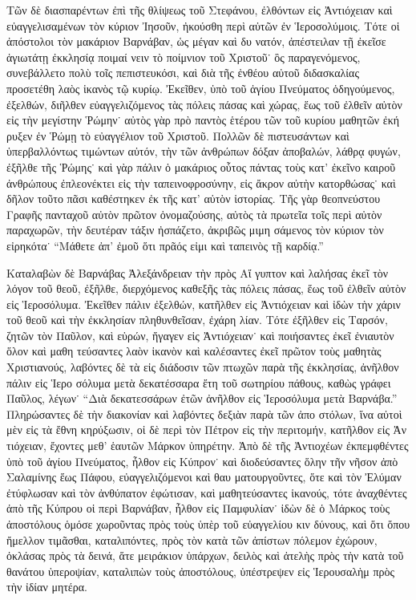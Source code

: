 Τῶν δὲ διασπαρέντων ἐπὶ τῆς θλίψεως τοῦ Στεφάνου,
ἐλθόντων εἰς Ἀντιόχειαν καὶ εὐαγγελισαμένων τὸν κύριον
Ἰησοῦν, ἠκούσθη περὶ αὐτῶν ἐν Ἱεροσολύμοις. Τότε οἱ
ἀπόστολοι τὸν μακάριον Βαρνάβαν, ὡς μέγαν καὶ δυ%
νατόν, ἀπέστειλαν τῇ ἐκεῖσε ἁγιωτάτῃ ἐκκλησίᾳ ποιμαί%
νειν τὸ ποίμνιον τοῦ Χριστοῦ˙ ὃς παραγενόμενος,
συνεβάλλετο πολὺ τοῖς πεπιστευκόσι, καὶ διὰ τῆς ἐνθέου
αὐτοῦ διδασκαλίας προσετέθη λαὸς ἱκανὸς τῷ κυρίῳ.
Ἐκεῖθεν, ὑπὸ τοῦ ἁγίου Πνεύματος ὁδηγούμενος, ἐξελθών,
διῆλθεν εὐαγγελιζόμενος τὰς πόλεις πάσας καὶ χώρας,
ἕως τοῦ ἐλθεῖν αὐτὸν εἰς τὴν μεγίστην Ῥώμην˙ αὐτὸς
γὰρ πρὸ παντὸς ἑτέρου τῶν τοῦ κυρίου μαθητῶν ἐκή%
ρυξεν ἐν Ῥώμῃ τὸ εὐαγγέλιον τοῦ Χριστοῦ. Πολλῶν
δὲ πιστευσάντων καὶ ὑπερβαλλόντως τιμώντων αὐτόν,
τὴν τῶν ἀνθρώπων δόξαν ἀποβαλών, λάθρᾳ φυγών,
ἐξῆλθε τῆς Ῥώμης˙ καὶ γὰρ πάλιν ὁ μακάριος οὗτος
πάντας τοὺς κατ’ ἐκεῖνο καιροῦ ἀνθρώπους ἐπλεονέκτει
εἰς τὴν ταπεινοφροσύνην, εἰς ἄκρον αὐτὴν κατορθώσας˙
καὶ δῆλον τοῦτο πᾶσι καθέστηκεν ἐκ τῆς κατ’ αὐτὸν
ἱστορίας. Τῆς γὰρ θεοπνεύστου Γραφῆς πανταχοῦ αὐτὸν
πρῶτον ὀνομαζούσης, αὐτὸς τὰ πρωτεῖα τοῖς περὶ αὐτὸν
παραχωρῶν, τὴν δευτέραν τάξιν ἠσπάζετο, ἀκριβῶς μιμη%
σάμενος τὸν κύριον τὸν εἰρηκότα˙ \enquote{Μάθετε ἀπ’ ἐμοῦ ὅτι
πρᾶός εἰμι καὶ ταπεινὸς τῇ καρδίᾳ.}

Καταλαβὼν δὲ Βαρνάβας Ἀλεξάνδρειαν τὴν πρὸς Αἴ%
γυπτον καὶ λαλήσας ἐκεῖ τὸν λόγον τοῦ θεοῦ, ἐξῆλθε,
διερχόμενος καθεξῆς τὰς πόλεις πάσας, ἕως τοῦ ἐλθεῖν
αὐτὸν εἰς Ἱεροσόλυμα. Ἐκεῖθεν πάλιν ἐξελθών, κατῆλθεν
εἰς Ἀντιόχειαν καὶ ἰδὼν τὴν χάριν τοῦ θεοῦ καὶ τὴν
ἐκκλησίαν πληθυνθεῖσαν, ἐχάρη λίαν. Τότε ἐξῆλθεν εἰς
Ταρσόν, ζητῶν τὸν Παῦλον, καὶ εὑρών, ἤγαγεν εἰς
Ἀντιόχειαν˙ καὶ ποιήσαντες ἐκεῖ ἐνιαυτὸν ὅλον καὶ μαθη%
τεύσαντες λαὸν ἱκανὸν καὶ καλέσαντες ἐκεῖ πρῶτον τοὺς
μαθητὰς Χριστιανούς, λαβόντες δὲ τὰ εἰς διάδοσιν τῶν
πτωχῶν παρὰ τῆς ἐκκλησίας, ἀνῆλθον πάλιν εἰς Ἱερο%
σόλυμα μετὰ δεκατέσσαρα ἔτη τοῦ σωτηρίου πάθους,
καθὼς γράφει Παῦλος, λέγων˙ \enquote{Διὰ δεκατεσσάρων ἐτῶν
ἀνῆλθον εἰς Ἱεροσόλυμα μετὰ Βαρνάβα.} Πληρώσαντες
δὲ τὴν διακονίαν καὶ λαβόντες δεξιὰν παρὰ τῶν ἀπο%
στόλων, ἵνα αὐτοὶ μὲν εἰς τὰ ἔθνη κηρύξωσιν, οἱ δὲ
περὶ τὸν Πέτρον εἰς τὴν περιτομήν, κατῆλθον εἰς Ἀν%
τιόχειαν, ἔχοντες μεθ’ ἑαυτῶν Μάρκον ὑπηρέτην. Ἀπὸ δὲ
τῆς Ἀντιοχέων ἐκπεμφθέντες ὑπὸ τοῦ ἁγίου Πνεύματος,
ἦλθον εἰς Κύπρον˙ καὶ διοδεύσαντες ὅλην τῆν νῆσον
ἀπὸ Σαλαμίνης ἕως Πάφου, εὐαγγελιζόμενοι καὶ θαυ%
ματουργοῦντες, ὅτε καὶ τὸν Ἐλύμαν ἐτύφλωσαν καὶ τὸν
ἀνθύπατον ἐφώτισαν, καὶ μαθητεύσαντες ἱκανούς, τότε
ἀναχθέντες ἀπὸ τῆς Κύπρου οἱ περὶ Βαρνάβαν, ἦλθον
εἰς Παμφυλίαν˙ ἰδὼν δὲ ὁ Μάρκος τοὺς ἀποστόλους
ὁμόσε χωροῦντας πρὸς τοὺς ὑπὲρ τοῦ εὐαγγελίου κιν%
δύνους, καὶ ὅτι ὅπου ἤμελλον τιμᾶσθαι, καταλιπόντες,
πρὸς τὸν κατὰ τῶν ἀπίστων πόλεμον ἐχώρουν, ὀκλάσας
πρὸς τὰ δεινά, ἅτε μειράκιον ὑπάρχων, δειλὸς καὶ ἀτελὴς
πρὸς τὴν κατὰ τοῦ θανάτου ὑπεροψίαν, καταλιπὼν τοὺς
ἀποστόλους, ὑπέστρεψεν εἰς Ἱερουσαλὴμ πρὸς τὴν ἰδίαν
μητέρα.

